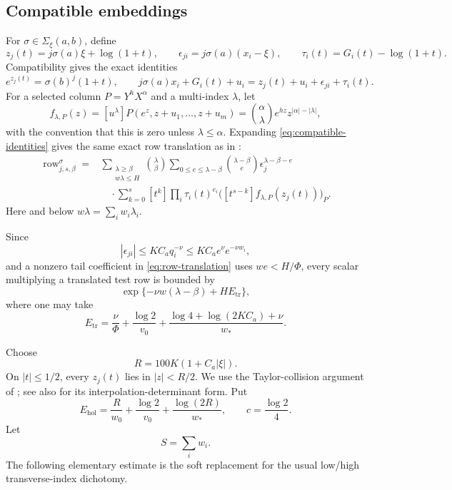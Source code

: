 \documentclass[11pt]{article}
\newcommand{\Comp}{\Sigma_{\xi}(a,b)}
\theoremstyle{definition}
\theoremstyle{remark}
\numberwithin{equation}{section}
\begin{document}
\subsection{Compatible embeddings}

For $\sigma\in\Comp$, define
\[
 z_j(t)=j\sigma(a)\xi+\log(1+t),
 \qquad
 \epsilon_{ji}=j\sigma(a)(x_i-\xi),
 \qquad
 \tau_i(t)=G_i(t)-\log(1+t).
\]
Compatibility gives the exact identities
\begin{equation}\label{eq:compatible-identities}
 e^{z_j(t)}=\sigma(b)^j(1+t),
 \qquad
 j\sigma(a)x_i+G_i(t)+u_i
 =z_j(t)+u_i+\epsilon_{ji}+\tau_i(t).
\end{equation}
For a selected column $P=Y^hX^\alpha$ and a multi-index $\lambda$, let
\[
 f_{\lambda,P}(z)
 =[u^\lambda]P(e^z,z+u_1,\ldots,z+u_m)
 =\binom\alpha\lambda e^{hz}z^{|\alpha|-|\lambda|},
\]
with the convention that this is zero unless $\lambda\le\alpha$.
Expanding \eqref{eq:compatible-identities} gives the same exact row
translation as in \cite[Section~5.1]{LiuJiangZhang2026}:
\begin{align}\label{eq:row-translation}
 \operatorname{row}_{j,s,\beta}^{\sigma}
 ={}&\sum_{\substack{\lambda\ge\beta\\w\lambda\le H}}
 \binom\lambda\beta
 \sum_{0\le e\le\lambda-\beta}
 \binom{\lambda-\beta}{e}
 \epsilon_j^{\lambda-\beta-e}\\
 &\quad\cdot\sum_{k=0}^s
 [t^k]\prod_i\tau_i(t)^{e_i}
 \bigl([t^{s-k}]f_{\lambda,P}(z_j(t))\bigr)_P.
 \nonumber
\end{align}
Here and below $w\lambda=\sum_iw_i\lambda_i$.

Since
\[
 |\epsilon_{ji}|
 \le KC_aq_i^{-\nu}
 \le KC_ae^{\nu}e^{-\nu w_i},
\]
and a nonzero tail coefficient in \eqref{eq:row-translation} uses
$we<H/\Phi$, every scalar multiplying a translated test row is bounded
by
\begin{equation}\label{eq:translation-scalar}
 \exp\{-\nu w(\lambda-\beta)+HE_{\mathrm{tr}}\},
\end{equation}
where one may take
\begin{equation}\label{eq:Etr}
 E_{\mathrm{tr}}
 =\frac\nu\Phi+\frac{\log2}{v_0}
 +\frac{\log4+\log(2KC_a)+\nu}{w_*}.
\end{equation}

Choose
\[
 R=100K(1+C_a|\xi|).
\]
On $|t|\le1/2$, every $z_j(t)$ lies in $|z|<R/2$.  We use the
Taylor-collision argument of \cite[Section~5.2]{LiuJiangZhang2026}; see
also \cite{Laurent2000} for its interpolation-determinant form.  Put
\begin{equation}\label{eq:Ehol}
 E_{\mathrm{hol}}
 =\frac R{w_0}+\frac{\log2}{v_0}
  +\frac{\log(2R)}{w_*},
 \qquad c=\frac{\log2}{4}.
\end{equation}
Let
\[
 S=\sum_iw_i.
\]
The following elementary estimate is the soft replacement for the usual
low/high transverse-index dichotomy.
\end{document}
